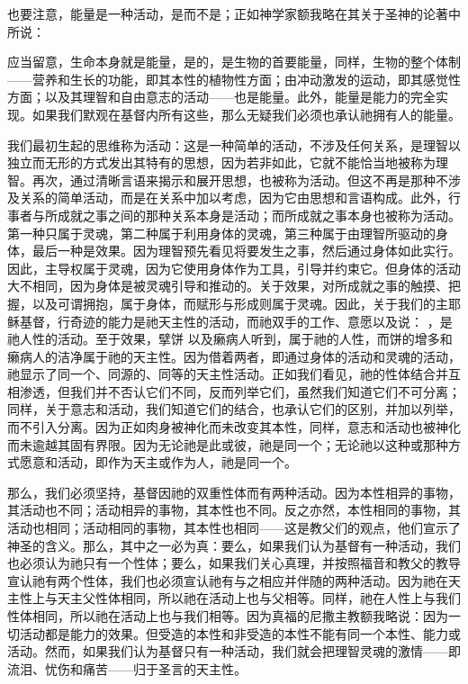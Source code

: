 也要注意，能量是一种活动，是而不是；正如神学家额我略在其关于圣神的论著中所说：\par

应当留意，生命本身就是能量，是的，是生物的首要能量，同样，生物的整个体制——营养和生长的功能，即其本性的植物性方面；由冲动激发的运动，即其感觉性方面；以及其理智和自由意志的活动——也是能量。此外，能量是能力的完全实现。如果我们默观在基督内所有这些，那么无疑我们必须也承认祂拥有人的能量。\par

我们最初生起的思维称为活动：这是一种简单的活动，不涉及任何关系，是理智以独立而无形的方式发出其特有的思想，因为若非如此，它就不能恰当地被称为理智。再次，通过清晰言语来揭示和展开思想，也被称为活动。但这不再是那种不涉及关系的简单活动，而是在关系中加以考虑，因为它由思想和言语构成。此外，行事者与所成就之事之间的那种关系本身是活动；而所成就之事本身也被称为活动。第一种只属于灵魂，第二种属于利用身体的灵魂，第三种属于由理智所驱动的身体，最后一种是效果。因为理智预先看见将要发生之事，然后通过身体如此实行。因此，主导权属于灵魂，因为它使用身体作为工具，引导并约束它。但身体的活动大不相同，因为身体是被灵魂引导和推动的。关于效果，对所成就之事的触摸、把握，以及可谓拥抱，属于身体，而赋形与形成则属于灵魂。因此，关于我们的主耶稣基督，行奇迹的能力是祂天主性的活动，而祂双手的工作、意愿以及说： ，是祂人性的活动。至于效果，擘饼  以及癞病人听到，属于祂的人性，而饼的增多和癞病人的洁净属于祂的天主性。因为借着两者，即通过身体的活动和灵魂的活动，祂显示了同一个、同源的、同等的天主性活动。正如我们看见，祂的性体结合并互相渗透，但我们并不否认它们不同，反而列举它们，虽然我们知道它们不可分离；同样，关于意志和活动，我们知道它们的结合，也承认它们的区别，并加以列举，而不引入分离。因为正如肉身被神化而未改变其本性，同样，意志和活动也被神化而未逾越其固有界限。因为无论祂是此或彼，祂是同一个；无论祂以这种或那种方式愿意和活动，即作为天主或作为人，祂是同一个。\par

那么，我们必须坚持，基督因祂的双重性体而有两种活动。因为本性相异的事物，其活动也不同；活动相异的事物，其本性也不同。反之亦然，本性相同的事物，其活动也相同；活动相同的事物，其本性也相同——这是教父们的观点，他们宣示了神圣的含义。那么，其中之一必为真：要么，如果我们认为基督有一种活动，我们也必须认为祂只有一个性体；要么，如果我们关心真理，并按照福音和教父的教导宣认祂有两个性体，我们也必须宣认祂有与之相应并伴随的两种活动。因为祂在天主性上与天主父性体相同，所以祂在活动上也与父相等。同样，祂在人性上与我们性体相同，所以祂在活动上也与我们相等。因为真福的尼撒主教额我略说：因为一切活动都是能力的效果。但受造的本性和非受造的本性不能有同一个本性、能力或活动。然而，如果我们认为基督只有一种活动，我们就会把理智灵魂的激情——即流泪、忧伤和痛苦——归于圣言的天主性。\par

